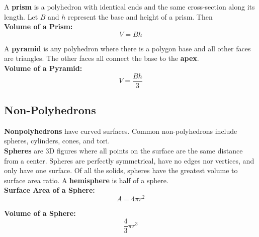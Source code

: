         \noindent A \textbf{prism} is a polyhedron with identical ends and the same cross-section
        along its length. Let $B$ and $h$ represent the base and height of a prism. Then  \\

        \noindent \color{purple} \textbf{Volume of a Prism:} \color{black}
        \begin{equation*}
            V = Bh
        \end{equation*}

        \noindent A \textbf{pyramid} is any polyhedron where there is a polygon base and all
        other faces are triangles. The other faces all connect the base to the \textbf{apex}. \\

        \noindent \color{purple} \textbf{Volume of a Pyramid:} \color{black} \\
        \begin{equation*}
            V = \frac{Bh}{3}
        \end{equation*}



    \subsection{Non-Polyhedrons}
        \textbf{Nonpolyhedrons} have curved surfaces. Common non-polyhedrons include spheres,
        cylinders, cones, and tori. \\

        \noindent \textbf{Spheres} are 3D figures where all points on the surface are the same
        distance from a center. Spheres are perfectly symmetrical, have no edges nor vertices,
        and only have one surface. Of all the solids, spheres have the greatest volume to surface
        area ratio. A \textbf{hemisphere} is half of a sphere. \\

        \pagebreak
        \noindent \color{purple} \textbf{Surface Area of a Sphere:} \color{black} \\

        \begin{equation*}
            A = 4\pi r^2
        \end{equation*}

        \noindent \color{purple} \textbf{Volume of a Sphere:} \color{black} \\

        \begin{equation*}
            \frac{4}{3}\pi r^3
        \end{equation*}

